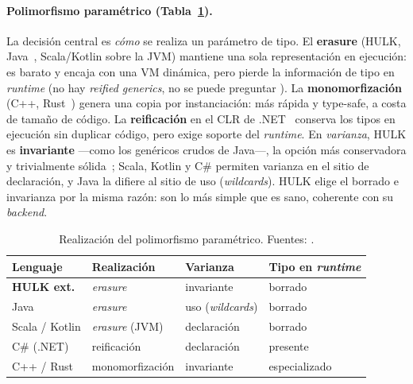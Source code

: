 \documentclass[14pts,runningheads,a4paper]{llncs}
\newcommand{\code}[1]{\texttt{\detokenize{#1}}}
\begin{document}
\paragraph{ Polimorfismo param\'etrico (Tabla~\ref{tab:cmp-gen}).}
La decisi\'on central es \emph{c\'omo} se realiza un par\'ametro de tipo. El
\textbf{erasure} (HULK, Java~\cite{bracha1998gj,gosling2014java}, Scala/Kotlin sobre
la JVM) mantiene una sola representaci\'on en ejecuci\'on: es barato y encaja con una VM
din\'amica, pero pierde la informaci\'on de tipo en \emph{runtime} (no hay \emph{reified
generics}, no se puede preguntar \code{x is List[Number]}). La
\textbf{monomorfizaci\'on} (C++, Rust~\cite{klabnik2023rust}) genera una copia por
instanciaci\'on: m\'as r\'apida y type-safe, a costa de tama\~no de c\'odigo. La
\textbf{reificaci\'on} en el CLR de .NET~\cite{kennedy2001generics} conserva los tipos
en ejecuci\'on sin duplicar c\'odigo, pero exige soporte del \emph{runtime}. En
\emph{varianza}, HULK es \textbf{invariante} ---como los gen\'ericos crudos de Java---,
la opci\'on m\'as conservadora y trivialmente s\'olida~\cite{pierce2002types}; Scala,
Kotlin y C\# permiten varianza en el sitio de declaraci\'on, y Java la difiere al sitio
de uso (\emph{wildcards}). HULK elige el borrado e invarianza por la misma raz\'on:
son lo m\'as simple que es sano, coherente con su \emph{backend}.

\begin{table}[h!]
\centering\small
\caption{Realizaci\'on del polimorfismo param\'etrico. Fuentes:
\cite{bracha1998gj,gosling2014java,kennedy2001generics,klabnik2023rust,pierce2002types}.}
\label{tab:cmp-gen}
\begin{tabular}{@{}llll@{}}
\toprule
\textbf{Lenguaje} & \textbf{Realizaci\'on} & \textbf{Varianza} & \textbf{Tipo en \emph{runtime}} \\
\midrule
\textbf{HULK ext.} & \emph{erasure} & invariante & borrado \\
Java & \emph{erasure} & uso (\emph{wildcards}) & borrado \\
Scala / Kotlin & \emph{erasure} (JVM) & declaraci\'on & borrado \\
C\# (.NET) & reificaci\'on & declaraci\'on & presente \\
C++ / Rust & monomorfizaci\'on & invariante & especializado \\
\bottomrule
\end{tabular}
\end{table}
\end{document}
